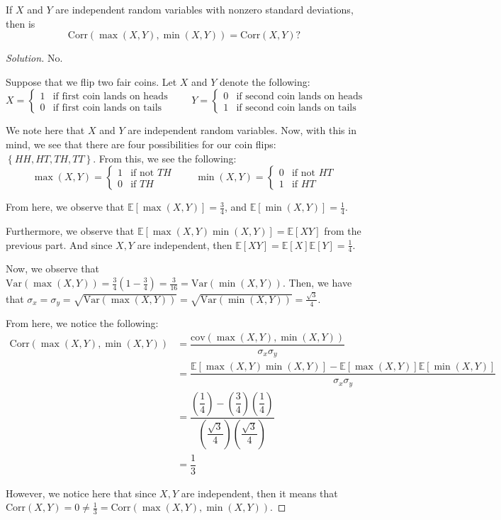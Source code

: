 \documentclass{article}
\newenvironment{solution}{\begin{proof}[Solution]}{\end{proof}}
\newcommand{\E}{\mathbb{E}}
\newcommand{\Var}{\mathrm{Var}}
\newcommand{\cov}{\mathrm{cov}}
\newcommand{\corr}{\mathrm{Corr}}
\begin{document}
\begin{hw}
	If $X$ and $Y$ are independent random variables with nonzero standard deviations, then is $$\corr (\max (X, Y), \min (X, Y)) = \corr (X, Y) ?$$
\end{hw}
\begin{solution}
	No.
	
	Suppose that we flip two fair coins. Let $X$ and $Y$ denote the following:
	\[
	X = 
	\begin{cases}
		1 & \text{if first coin lands on heads} \\
		0 & \text{if first coin lands on tails}
	\end{cases} \qquad
	Y =
	\begin{cases}
		0 & \text{if second coin lands on heads} \\
		1 & \text{if second coin lands on tails}
	\end{cases}
	\]
	
	We note here that $X$ and $Y$ are independent random variables. Now, with this in mind, we see that there are four possibilities for our coin flips: $\left\{  HH, HT, TH, TT\right\}$. From this, we see the following:
	\[
	\max(X,Y) = 
	\begin{cases}
		1 & \text{if not $TH$} \\
		0 & \text{if $TH$}
	\end{cases} \qquad
	\min(X,Y) =
	\begin{cases}
		0 & \text{if not $HT$} \\
		1 & \text{if $HT$}
	\end{cases}
	\]
	
	From here, we observe that $\E[\max(X,Y)] = \frac{3}{4}$, and $\E[\min(X,Y)] = \frac{1}{4}$.
	
	Furthermore, we observe that $\E[\max(X,Y)\min(X,Y)] = \E[XY]$ from the previous part. And since $X, Y$ are independent, then $\E[XY] = \E[X]\E[Y] = \frac{1}{4}$.
	
	Now, we observe that $\Var(\max(X,Y)) = \frac{3}{4}\left( 1 - \frac{3}{4} \right) = \frac{3}{16} = \Var(\min(X,Y))$. Then, we have that $\sigma_{x} = \sigma_{y} = \sqrt{\Var(\max(X,Y))} = \sqrt{\Var(\min(X,Y))} = \frac{\sqrt{3}}{4}$.
	
	From here, we notice the following:
	\begin{align*}
		\corr(\max(X,Y), \min(X,Y)) &= \dfrac{\cov(\max(X,Y), \min(X,Y))}{\sigma_x\sigma_y} \\
		&= \dfrac{\E[\max(X,Y)\min(X,Y)] - \E[\max(X,Y)]\E[\min(X,Y)]}{\sigma_x\sigma_y} \\
		&= \dfrac{\left( \dfrac{1}{4} \right) - \left( \dfrac{3}{4} \right)\left( \dfrac{1}{4} \right)}{\left( \dfrac{\sqrt{3}}{4} \right)\left( \dfrac{\sqrt{3}}{4} \right)} \\
		&= \dfrac{1}{3}
	\end{align*}

	However, we notice here that since $X,Y$ are independent, then it means that $\corr(X,Y) = 0 \not= \frac{1}{3} = \corr(\max(X,Y), \min(X,Y))$.
\end{solution}
\end{document}
